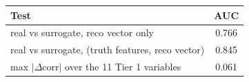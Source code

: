 \begin{tabular}{lc}
\toprule
Test & AUC \\
\midrule
real vs surrogate, reco vector only & 0.766 \\
real vs surrogate, (truth features, reco vector) & 0.845 \\
\midrule
max $|\Delta$corr$|$ over the 11 Tier 1 variables & 0.061 \\
\bottomrule
\end{tabular}
